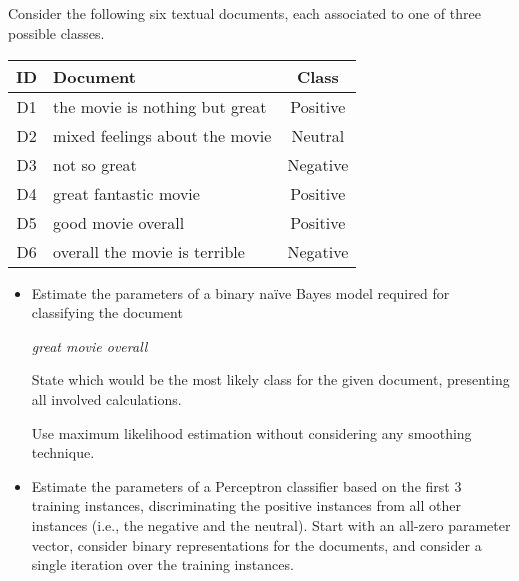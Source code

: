 \documentclass[12pt]{article}
\begin{document}

\subsection{}

Consider the following six textual documents, each associated to one of three possible classes.

\begin{table}[h!]
\centering
\begin{tabular}{ | c | l | c |}
  \hline			
ID & Document                          & Class \\
  \hline
D1 & the movie is nothing but great   & Positive \\
D2 & mixed feelings about the movie	  & Neutral \\
D3 & not so great			          & Negative \\
D4 & great fantastic movie			  & Positive \\
D5 & good movie overall			      & Positive \\
D6 & overall the movie is terrible    & Negative \\
  \hline  
\end{tabular}
\end{table}

\begin{itemize}
\item Estimate the parameters of a binary na{\"i}ve Bayes model required for classifying the document
    \begin{center}
        \emph{great movie overall}
    \end{center}
State which would be the most likely class for the given document, presenting all involved calculations.

    Use maximum likelihood estimation without considering any smoothing technique.

\item Estimate the parameters of a Perceptron classifier based on the first 3 training instances, discriminating the positive instances from all other instances (i.e., the negative and the neutral). Start with an all-zero parameter vector, consider binary representations for the documents, and consider a single iteration over the training instances.
\end{itemize}
\end{document}

